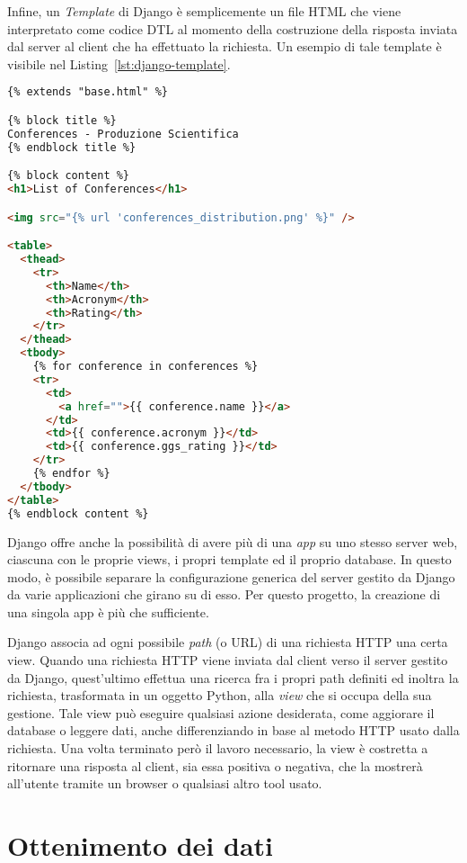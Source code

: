 Infine, un \textit{Template} di Django è semplicemente un file HTML che
viene interpretato come codice DTL al momento della costruzione della risposta
inviata dal server al client che ha effettuato la richiesta. Un esempio di tale
template è visibile nel Listing~\ref{lst:django-template}.

\begin{lstlisting}[language=HTML, caption=Template per l'elenco delle conferenze,label=lst:django-template]
{% extends "base.html" %}

{% block title %}
Conferences - Produzione Scientifica
{% endblock title %}

{% block content %}
<h1>List of Conferences</h1>

<img src="{% url 'conferences_distribution.png' %}" />

<table>
  <thead>
    <tr>
      <th>Name</th>
      <th>Acronym</th>
      <th>Rating</th>
    </tr>
  </thead>
  <tbody>
    {% for conference in conferences %}
    <tr>
      <td>
        <a href="">{{ conference.name }}</a>
      </td>
      <td>{{ conference.acronym }}</td>
      <td>{{ conference.ggs_rating }}</td>
    </tr>
    {% endfor %}
  </tbody>
</table>
{% endblock content %}
\end{lstlisting}

Django offre anche la possibilità di avere più di una \textit{app} su uno stesso
server web, ciascuna con le proprie views, i propri template ed il proprio
database. In questo modo, è possibile separare la configurazione generica del
server gestito da Django da varie applicazioni che girano su di esso.
Per questo progetto, la creazione di una singola app è più che sufficiente.

Django associa ad ogni possibile \textit{path} (o URL) di una richiesta HTTP
una certa view. Quando una richiesta HTTP viene inviata dal client verso il
server gestito da Django, quest'ultimo effettua una ricerca fra i propri path
definiti ed inoltra la richiesta, trasformata in un oggetto Python, alla
\textit{view} che si occupa della sua gestione.
Tale view può eseguire qualsiasi azione desiderata, come aggiorare il database o
leggere dati, anche differenziando in base al metodo HTTP usato dalla richiesta.
Una volta terminato però il lavoro necessario, la view è costretta a ritornare
una risposta al client, sia essa positiva o negativa, che la mostrerà all'utente
tramite un browser o qualsiasi altro tool usato.

\section{Ottenimento dei dati}

